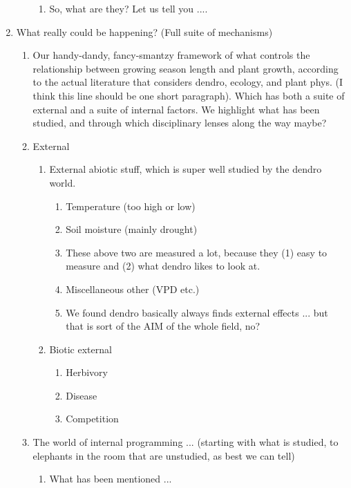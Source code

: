 \documentclass[11pt,letter]{article}
\begin{document}
\begin{enumerate}
\begin{enumerate}
\begin{enumerate}
\item So, what are they? Let us tell you .... %
\end{enumerate}
\end{enumerate}
\item What really could be happening? (Full suite of mechanisms)
\begin{enumerate}
\item Our handy-dandy, fancy-smantzy framework of what controls the relationship between growing season length and plant growth, according to the actual literature that considers dendro, ecology, and plant phys. (I think this line should be one short paragraph). Which has both a suite of external and a suite of internal factors. We highlight what has been studied, and through which disciplinary lenses along the way maybe?
\item External 
\begin{enumerate}
\item External abiotic stuff, which is super well studied by the dendro world. 
\begin{enumerate}
\item Temperature (too high or low)
\item Soil moisture (mainly drought)
\item These above two are measured a lot, because they (1) easy to measure and (2) what dendro likes to look at. 
\item Miscellaneous other (VPD etc.)
\item We found dendro basically always finds external effects ... but that is sort of the AIM of the whole field, no? 
\end{enumerate}
\item Biotic external
\begin{enumerate}
\item Herbivory
\item Disease
\item Competition
\end{enumerate}
\end{enumerate}
\item The world of internal programming ... (starting with what is studied, to elephants in the room that are unstudied, as best we can tell)
\begin {enumerate}
\item What has been mentioned ... 
\begin {enumerate}

\end{enumerate}
\end{enumerate}
\end{enumerate}
\end{enumerate}
\end{document}
